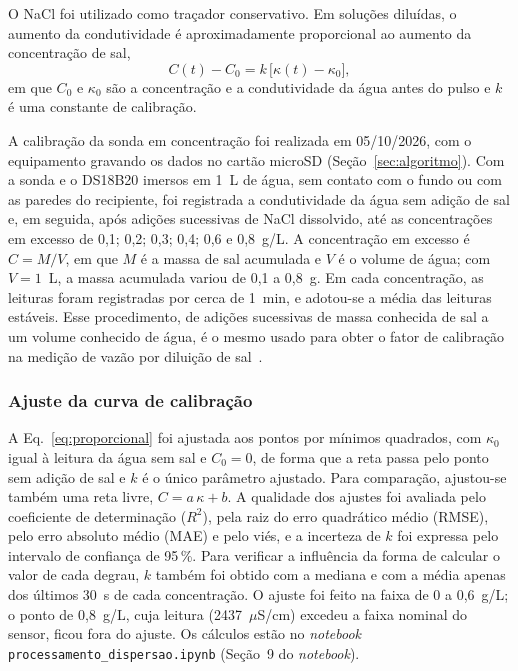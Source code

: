 \documentclass[12pt,a4paper]{article}
\providecommand{\uScm}{\ensuremath{\mu}S/cm}
\begin{document}
O NaCl foi utilizado como traçador conservativo. Em soluções diluídas, o aumento da condutividade é aproximadamente proporcional ao aumento da concentração de sal,
\begin{equation}
  C(t) - C_0 = k\,\bigl[\kappa(t) - \kappa_0\bigr],
  \label{eq:proporcional}
\end{equation}
em que $C_0$ e $\kappa_0$ são a concentração e a condutividade da água antes do pulso e $k$ é uma constante de calibração.

A calibração da sonda em concentração foi realizada em 05/10/2026, com o equipamento gravando os dados no cartão microSD (Seção~\ref{sec:algoritmo}). Com a sonda e o DS18B20 imersos em 1~L de água, sem contato com o fundo ou com as paredes do recipiente, foi registrada a condutividade da água sem adição de sal e, em seguida, após adições sucessivas de NaCl dissolvido, até as concentrações em excesso de 0,1; 0,2; 0,3; 0,4; 0,6 e 0,8~g/L. A concentração em excesso é $C = M/V$, em que $M$ é a massa de sal acumulada e $V$ é o volume de água; com $V = 1$~L, a massa acumulada variou de 0,1 a 0,8~g. Em cada concentração, as leituras foram registradas por cerca de 1~min, e adotou-se a média das leituras estáveis. Esse procedimento, de adições sucessivas de massa conhecida de sal a um volume conhecido de água, é o mesmo usado para obter o fator de calibração na medição de vazão por diluição de sal~\cite{moore2005}.

\subsubsection{Ajuste da curva de calibração}

A Eq.~\eqref{eq:proporcional} foi ajustada aos pontos por mínimos quadrados, com $\kappa_0$ igual à leitura da água sem sal e $C_0 = 0$, de forma que a reta passa pelo ponto sem adição de sal e $k$ é o único parâmetro ajustado. Para comparação, ajustou-se também uma reta livre, $C = a\,\kappa + b$. A qualidade dos ajustes foi avaliada pelo coeficiente de determinação ($R^2$), pela raiz do erro quadrático médio (RMSE), pelo erro absoluto médio (MAE) e pelo viés, e a incerteza de $k$ foi expressa pelo intervalo de confiança de 95\,\%. Para verificar a influência da forma de calcular o valor de cada degrau, $k$ também foi obtido com a mediana e com a média apenas dos últimos 30~s de cada concentração. O ajuste foi feito na faixa de 0 a 0,6~g/L; o ponto de 0,8~g/L, cuja leitura (2437~\uScm) excedeu a faixa nominal do sensor, ficou fora do ajuste. Os cálculos estão no \emph{notebook} \texttt{processamento\_\allowbreak dispersao.ipynb} (Seção~9 do \emph{notebook}).
\end{document}
